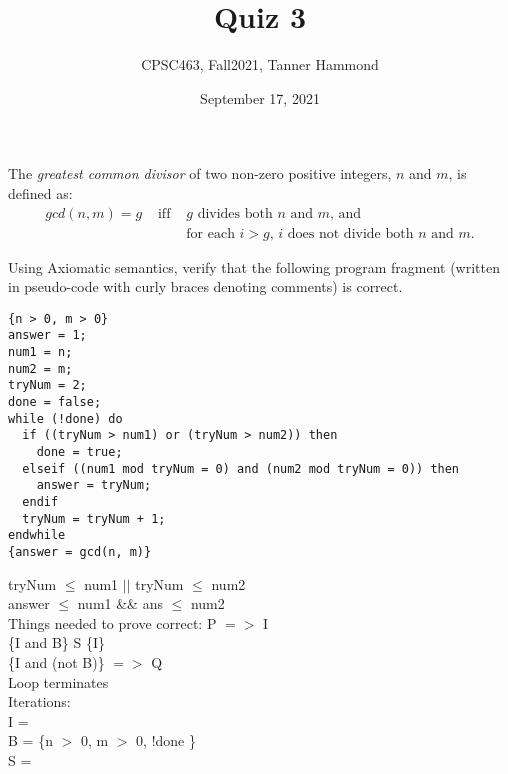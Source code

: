 \documentclass{article}
\title{Quiz 3}
\author{CPSC463, Fall2021,
        Tanner Hammond}
\date{September 17, 2021}
\begin{document}
\maketitle %


The \emph{greatest common divisor} of two non-zero positive integers,
$n$ and $m$, is defined as:
\begin{eqnarray*}
  gcd(n, m)  = g &\mbox{ iff }& \mbox{$g$ divides both $n$ and $m$, and}\\
  && \mbox{for each $i > g$, $i$ does not divide both $n$ and $m$.}
\end{eqnarray*}


Using Axiomatic semantics, verify that the following program fragment (written
in pseudo-code with curly braces denoting comments)
is correct.

\begin{verbatim}
{n > 0, m > 0}
answer = 1;
num1 = n;
num2 = m;
tryNum = 2;
done = false;
while (!done) do
  if ((tryNum > num1) or (tryNum > num2)) then
    done = true;
  elseif ((num1 mod tryNum = 0) and (num2 mod tryNum = 0)) then
    answer = tryNum;
  endif
  tryNum = tryNum + 1;
endwhile
{answer = gcd(n, m)}
\end{verbatim}

tryNum $\leq$ num1 $||$ tryNum $\leq$ num2\\
answer $\leq$ num1 \&\& ans $\leq$ num2\\

Things needed to prove correct:
P $=>$ I\\
\{I and B\} S \{I\}\\
\{I and (not B)\} $=>$ Q\\
Loop terminates\\

Iterations: \\

I =\\
B = \{n $>$ 0, m $>$ 0, !done \} \\
S =
\end{document}
